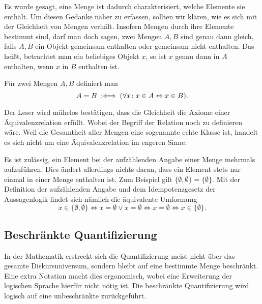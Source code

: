 Es wurde gesagt, eine Menge ist dadurch charakterisiert, welche
Elemente sie enthält. Um diesen Gedanke näher zu erfassen, sollten
wir klären, wie es sich mit der Gleichheit von Mengen verhält.
Insofern Mengen durch ihre Elemente bestimmt sind, darf man doch sagen,
zwei Mengen $A,B$ sind genau dann gleich, falls $A,B$ ein Objekt
gemeinsam enthalten oder gemeinsam nicht enthalten. Das heißt, betrachtet
man ein beliebiges Objekt $x$, so ist $x$ genau dann in $A$ enthalten,
wenn $x$ in $B$ enthalten ist.
\begin{Definition}\label{def:Mengen-Gleichheit}%
\newlinefirst
Für zwei Mengen $A,B$ definiert man
\[A = B \;:\Longleftrightarrow\; (\forall x\colon x\in A\Leftrightarrow x\in B).\]
\end{Definition}
Der Leser wird mühelos bestätigen, dass die Gleichheit die Axiome
einer Äquivalenzrelation erfüllt. Wobei der Begriff der Relation
noch zu definieren wäre. Weil die Gesamtheit aller Mengen eine
sogenannte echte Klasse ist, handelt es sich nicht um eine
Äquivalenzrelation im engeren Sinne.

Es ist zulässig, ein Element bei der aufzählenden Angabe einer Menge
mehrmals aufzuführen. Dies ändert allerdings nichts daran, dass ein
Element stets nur einmal in einer Menge enthalten ist. Zum Beispiel
gilt $\{\emptyset,\emptyset\}=\{\emptyset\}$. Mit der Definition der
aufzählenden Angabe und dem Idempotenzgesetz
der Aussagenlogik findet sich nämlich die äquivalente Umformung%
\[x\in\{\emptyset,\emptyset\}\iff x=\emptyset\lor x=\emptyset
\iff x=\emptyset\iff x\in\{\emptyset\}.\]

\subsection{Beschränkte Quantifizierung}

In der Mathematik erstreckt sich die Quantifizierung meist nicht
über das gesamte Diskursuniversum, sondern bleibt auf eine bestimmte
Menge beschränkt. Eine extra Notation macht dies ergonomisch, wobei
eine Erweiterung der logischen Sprache hierfür nicht nötig ist. Die
beschränkte Quantifizierung wird logisch auf eine unbeschränkte
zurückgeführt.

